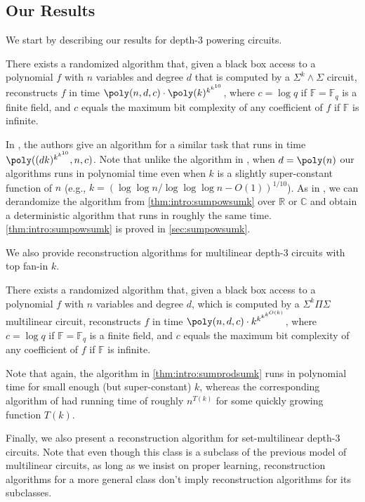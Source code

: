 \documentclass[12pt]{article}
\renewcommand{\C}{\mathbb{C}}
\renewcommand{\R}{\mathbb{R}}
\newcommand{\F}{\mathbb{F}}
\newcommand{\SumPowSumk}{\Sigma^k \!\wedge\! \Sigma}
\newcommand{\SumProdSumk}{\Sigma^k \Pi \Sigma}
\begin{document}
	\subsection{Our Results}
	\label{sec:results}
	
	We start by describing our results for depth-$3$ powering circuits.
	
	\begin{theorem}
		\label{thm:intro:sumpowsumk}
		There exists a randomized algorithm that, given a black box access to a polynomial $f$ with $n$ variables and degree $d$ that is computed by a $\SumPowSumk$ circuit, reconstructs $f$ in time $\poly(n,d,c) \cdot \poly(k)^{k^{k^{10}}}$, where $c=\log q$ if $\F=\F_q$ is a finite field, and $c$ equals the maximum bit complexity of any coefficient of $f$ if $\F$ is infinite.
	\end{theorem}
	
	In \cite{BSV21}, the authors give an algorithm for a similar task that runs in time $\poly((dk)^{k^{k^{10}}}, n, c)$. Note that unlike the algorithm in \cite{BSV21}, when $d=\poly(n)$ our algorithms runs in polynomial time even when $k$ is a slightly super-constant function of $n$ (e.g., $k = (\log\log n / \log \log \log n - O(1))^{1/10}$). As in \cite{BSV21}, we can derandomize the algorithm from \autoref{thm:intro:sumpowsumk} over $\R$ or $\C$ and obtain a deterministic algorithm that runs in roughly the same time. 
	\autoref{thm:intro:sumpowsumk} is proved in \autoref{sec:sumpowsumk}. 
	
	We also provide reconstruction algorithms for multilinear depth-$3$ circuits with top fan-in $k$.
	
	\begin{theorem}
		\label{thm:intro:sumprodsumk}
		There exists a randomized algorithm that, given a black box access to a polynomial $f$ with $n$ variables and degree $d$, which is computed by a $\SumProdSumk$ multilinear circuit, reconstructs $f$ in time $\poly(n,d,c) \cdot k^{k^{k^{k^{O(k)}}}}$, where $c=\log q$ if $\F=\F_q$ is a finite field, and $c$ equals the maximum bit complexity of any coefficient of $f$ if $\F$ is infinite.
	\end{theorem}
	
	Note that again, the algorithm in \autoref{thm:intro:sumprodsumk} runs in polynomial time for small enough (but super-constant) $k$, whereas the corresponding algorithm of \cite{BSV21} had running time of roughly $n^{T(k)}$ for some quickly growing function $T(k)$.
	
	
	Finally, we also present a reconstruction algorithm for set-multilinear depth-$3$ circuits. 
	Note that even though this class is a subclass of the previous model of multilinear circuits, as long as we insist on proper learning, reconstruction algorithms for a more general class don't imply reconstruction algorithms for its subclasses.
	
\end{document}
